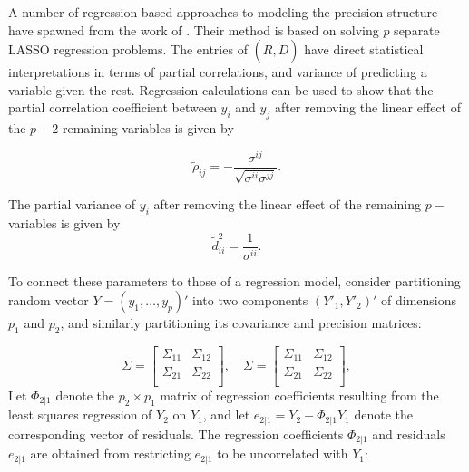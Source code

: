 \bigskip

A number of regression-based approaches to modeling the precision structure have spawned from the work of \cite{Meinshausen2006highDimGraphs}. Their method is based on solving $p$ separate LASSO regression problems. The entries of $\left(\tilde{R}, \tilde{D}\right)$ have direct statistical interpretations in terms of partial correlations, and variance of predicting a variable given the rest. Regression calculations can be used to show that the partial correlation coefficient between $y_i$ and $y_j$ after removing the linear effect of the $p - 2$ remaining variables is given by 

\begin{equation} \label{eq:partial-correlation}
\tilde{\rho}_{ij}= -\frac{\sigma^{ij}}{\sqrt{\sigma^{ii}\sigma^{jj}}}.
\end{equation}

\noindent
The partial variance of $y_i$ after removing the linear effect of the remaining $p-$ variables is given by 
\begin{equation} \label{eq:partial-variance}
\tilde{d}^2_{ii}= \frac{1}{\sigma^{ii}}.
\end{equation}

To connect these parameters to those of a regression model, consider partitioning random vector $Y = \left(y_1,\dots, y_p\right)'$ into two components $\left(Y'_1,Y'_2\right)'$ of dimensions $p_1$ and $p_2$, and similarly partitioning its covariance and precision matrices:

\begin{equation} \label{eq:partitioned-covariance-matrix}
\Sigma = \begin{bmatrix} \Sigma_{11} & \Sigma_{12} \\ \Sigma_{21} & \Sigma_{22} \\  
\end{bmatrix}, \quad \Sigma = \begin{bmatrix} \Sigma_{11} & \Sigma_{12} \\ \Sigma_{21} & \Sigma_{22} \\  
\end{bmatrix},
\end{equation}
\noindent
Let $\Phi_{2\vert 1}$ denote the $p_2 \times p_1$ matrix of regression coefficients resulting from the least squares regression of $Y_2$ on $Y_1$, and let $e_{2\vert 1} = Y_2 - \Phi_{2\vert 1} Y_1$ denote the corresponding vector of residuals. The regression coefficients $\Phi_{2\vert 1}$ and residuals $e_{2\vert 1}$ are obtained from restricting $e_{2\vert 1}$ to be uncorrelated with $Y_1$:


